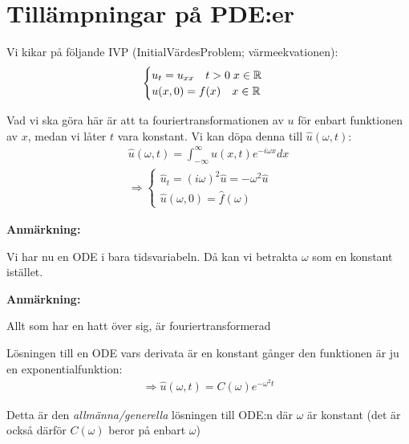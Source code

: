 \section{Tillämpningar på PDE:er}\par
\noindent Vi kikar på följande IVP (InitialVärdesProblem; värmeekvationen):
\begin{equation*}
  \begin{gathered}
    \begin{cases}
      u_t = u_{xx}\quad t>0\; x\in\mathbb{R}\\
      u(x,0) = f(x)\quad x\in\mathbb{R}
    \end{cases}
  \end{gathered}
\end{equation*}
\par\bigskip
\noindent Vad vi ska göra här är att ta fouriertransformationen av $u$ för enbart funktionen av $x$, medan vi låter $t$ vara konstant. Vi kan döpa denna till $\hat{u}(\omega, t)$:
\begin{equation*}
  \begin{gathered}
    \hat{u}(\omega,t) = \int_{-\infty}^{\infty}u(x,t)e^{-i\omega x}dx\\
    \Rightarrow \begin{cases}\hat{u}_t = (i\omega)^2\hat{u} = -\omega^2\hat{u}\\\hat{u}(\omega,0) = \hat{f}(\omega)\end{cases}
  \end{gathered}
\end{equation*}
\par\bigskip
\noindent\textbf{Anmärkning:}\par
\noindent Vi har nu en ODE i bara tidsvariabeln. Då kan vi betrakta $\omega$ som en konstant istället.
\par\bigskip
\noindent\textbf{Anmärkning:}\par
\noindent Allt som har en hatt över sig, är fouriertransformerad
\par\bigskip
\noindent Lösningen till en ODE vars derivata är en konstant gånger den funktionen är ju en exponentialfunktion:
\begin{equation*}
  \begin{gathered}
    \Rightarrow\hat{u}(\omega,t) = C(\omega)e^{-\omega^2t}
  \end{gathered}
\end{equation*}
\par\bigskip
\noindent Detta är den \textit{allmänna/generella} lösningen till ODE:n där $\omega$  är konstant (det är också därför $C(\omega)$ beror på enbart $\omega$)
